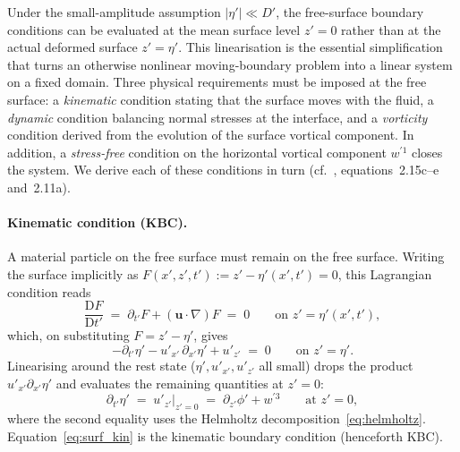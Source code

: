 \documentclass{article}
\newcommand{\uu}{\mathbf{u}}
\begin{document}
Under the small-amplitude assumption $|\eta'| \ll D'$, the free-surface boundary conditions can be evaluated at the mean surface level $z' = 0$ rather than at the actual deformed surface $z' = \eta'$.
This linearisation is the essential simplification that turns an otherwise nonlinear moving-boundary problem into a linear system on a fixed domain.
Three physical requirements must be imposed at the free surface: a \emph{kinematic} condition stating that the surface moves with the fluid, a \emph{dynamic} condition balancing normal stresses at the interface, and a \emph{vorticity} condition derived from the evolution of the surface vortical component.
In addition, a \emph{stress-free} condition on the horizontal vortical component $w^{\prime 1}$ closes the system.
We derive each of these conditions in turn (cf.\ \citealt{GaleanoRiosEtAl2017}, equations~2.15c--e and~2.11a).

\paragraph{Kinematic condition (KBC).}
A material particle on the free surface must remain on the free surface.
Writing the surface implicitly as $F(x', z', t') := z' - \eta'(x', t') = 0$, this Lagrangian condition reads
\begin{equation}
    \frac{\mathrm{D} F}{\mathrm{D} t'} \;=\; \partial_{t'} F + (\uu \cdot \nabla) F \;=\; 0 \qquad \text{on } z' = \eta'(x', t'), \label{eq:KBC_material}
\end{equation}
which, on substituting $F = z' - \eta'$, gives
\begin{equation}
    -\partial_{t'}\eta' - u'_{x'}\,\partial_{x'}\eta' + u'_{z'} \;=\; 0 \qquad \text{on } z' = \eta'. \label{eq:KBC_nonlinear}
\end{equation}
Linearising around the rest state ($\eta', u'_{x'}, u'_{z'}$ all small) drops the product $u'_{x'} \partial_{x'}\eta'$ and evaluates the remaining quantities at $z' = 0$:
\begin{equation}
    \partial_{t'}\eta' \;=\; u'_{z'}\big|_{z' = 0} \;=\; \partial_{z'}\phi' + w^{\prime 3} \qquad \text{at } z' = 0, \label{eq:surf_kin}
\end{equation}
where the second equality uses the Helmholtz decomposition~\eqref{eq:helmholtz}.
Equation~\eqref{eq:surf_kin} is the kinematic boundary condition (henceforth KBC).
\end{document}
